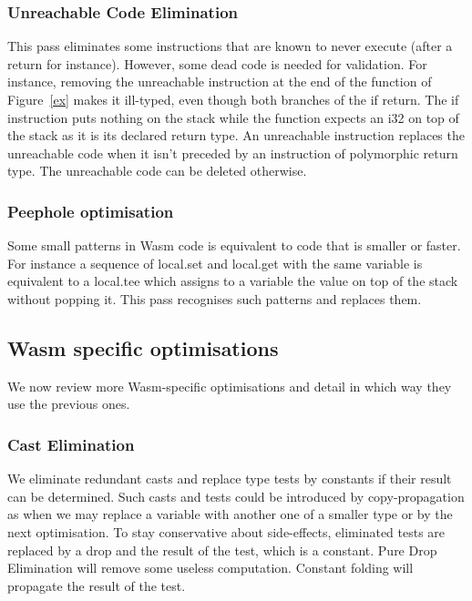 \documentclass[a4paper,11pt]{article}
\begin{document}
\subsubsection{Unreachable Code Elimination}
This pass eliminates some instructions that are known to never execute (after a
\textsf{return} for instance). However, some dead code is needed for validation.
For instance, removing the \textsf{unreachable} instruction at the end of the
function of Figure~\ref{ex} makes it ill-typed, even though both branches of the
if return. The \textsf{if} instruction puts nothing on the stack while the
function expects an \textsf{i32} on top of the stack as it is its declared
return type. An \textsf{unreachable} instruction replaces the unreachable code
when it isn't preceded by an instruction of polymorphic return type. The
unreachable code can be deleted otherwise.

\subsubsection{Peephole optimisation}
Some small patterns in Wasm code is equivalent to code that is smaller or
faster. For instance a sequence of \textsf{local.set} and \textsf{local.get}
with the same variable is equivalent to a \textsf{local.tee} which assigns to a
variable the value on top of the stack without popping it. This pass recognises
such patterns and replaces them.


\subsection{Wasm specific optimisations}
We now review more Wasm-specific optimisations and detail in which way they use
the previous ones.
\subsubsection{Cast Elimination}
We eliminate redundant casts and replace type tests by constants if their result
can be determined. Such casts and tests could be introduced by copy-propagation
as when we may replace a variable with another one of a smaller type or by the
next optimisation. To stay conservative about side-effects, eliminated tests are
replaced by a \textsf{drop} and the result of the test, which is a constant.
Pure Drop Elimination will remove some useless computation. Constant folding
will propagate the result of the test.
\end{document}
